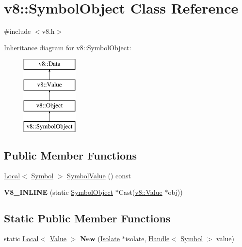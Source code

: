 \hypertarget{classv8_1_1_symbol_object}{}\section{v8\+:\+:Symbol\+Object Class Reference}
\label{classv8_1_1_symbol_object}


{\ttfamily \#include $<$v8.\+h$>$}

Inheritance diagram for v8\+:\+:Symbol\+Object\+:\begin{figure}[H]
\begin{center}
\leavevmode
\includegraphics[height=4.000000cm]{classv8_1_1_symbol_object}
\end{center}
\end{figure}
\subsection*{Public Member Functions}
\begin{DoxyCompactItemize}
\item 
\hyperlink{classv8_1_1_local}{Local}$<$ \hyperlink{classv8_1_1_symbol}{Symbol} $>$ \hyperlink{classv8_1_1_symbol_object_abae1f1d54533c784d2665bbb5b20f5b4}{Symbol\+Value} () const 
\item 
\hypertarget{classv8_1_1_symbol_object_a6eed92b3b2b6abdbaa37b59ed50549ae}{}{\bfseries V8\+\_\+\+I\+N\+L\+I\+N\+E} (static \hyperlink{classv8_1_1_symbol_object}{Symbol\+Object} $\ast$Cast(\hyperlink{classv8_1_1_value}{v8\+::\+Value} $\ast$obj))\label{classv8_1_1_symbol_object_a6eed92b3b2b6abdbaa37b59ed50549ae}

\end{DoxyCompactItemize}
\subsection*{Static Public Member Functions}
\begin{DoxyCompactItemize}
\item 
\hypertarget{classv8_1_1_symbol_object_a74dfdb8fdd78b14f860e3b20dc7bdc9d}{}static \hyperlink{classv8_1_1_local}{Local}$<$ \hyperlink{classv8_1_1_value}{Value} $>$ {\bfseries New} (\hyperlink{classv8_1_1_isolate}{Isolate} $\ast$isolate, \hyperlink{classv8_1_1_handle}{Handle}$<$ \hyperlink{classv8_1_1_symbol}{Symbol} $>$ value)\label{classv8_1_1_symbol_object_a74dfdb8fdd78b14f860e3b20dc7bdc9d}

\end{DoxyCompactItemize}


